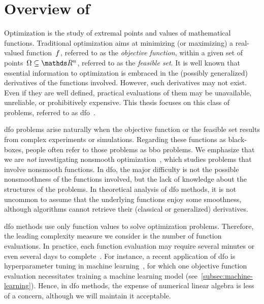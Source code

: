 \section{Overview of }

Optimization is the study of extremal points and values of mathematical functions.
Traditional optimization aims at minimizing (or maximizing) a real-valued function~$f$, referred to as the \emph{objective function}, within a given set of points~$\Omega \subseteq \R^n$, referred to as the \emph{feasible set}.
It is well known that essential information to optimization is embraced in the (possibly generalized) derivatives of the functions involved.
However, such derivatives may not exist.
Even if they are well defined, practical evaluations of them may be unavailable, unreliable, or prohibitively expensive.
This thesis focuses on this class of problems, referred to as \gls{dfo}~\cite{Conn_Scheinberg_Vicente_2009b,Audet_Hare_2017,Custodio_Scheinberg_Vicente_2017,Larson_Menickelly_Wild_2019}.

\Gls{dfo} problems arise naturally when the objective function or the feasible set results from complex experiments or simulations.
Regarding these functions as black-boxes, people often refer to those problems as \gls{bbo} problems.
We emphasize that we are \emph{not} investigating nonsmooth optimization~\cite{Clark_1983,Cui_Pang_2021}, which studies problems that involve nonsmooth functions.
In \gls{dfo}, the major difficulty is not the possible nonsmoothness of the functions involved, but the lack of knowledge about the structures of the problems.
In theoretical analysis of \gls{dfo} methods, it is not uncommon to assume that the underlying functions enjoy some smoothness, although algorithms cannot retrieve their (classical or generalized) derivatives.

\Gls{dfo} methods use only function values to solve optimization problems.
Therefore, the leading complexity measure we consider is the number of function evaluations.
In practice, each function evaluation may require several minutes or even several days to complete~\cite[\S 1.4]{Audet_Hare_2017}.
For instance, a recent application of \gls{dfo} is hyperparameter tuning in machine learning~\cite{Ghanbari_Scheinberg_2017}, for which one objective function evaluation necessitates training a machine learning model (see~\cref{subsec:machine-learning}).
Hence, in \gls{dfo} methods, the expense of numerical linear algebra is less of a concern, although we will maintain it acceptable.

